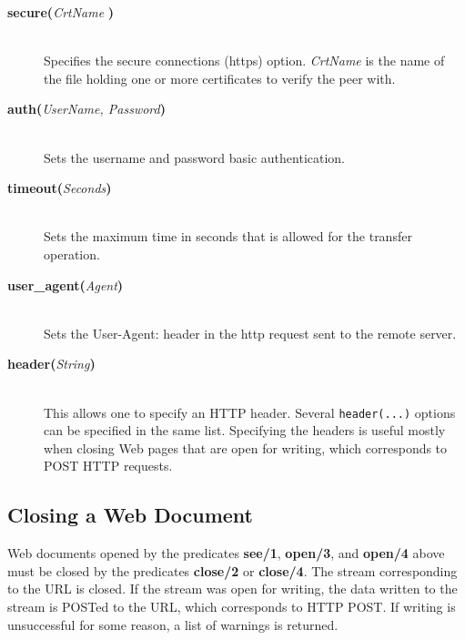 \begin{description}
\begin{description}
  \item[{\bf secure}{\bf (}{\it CrtName}{\bf
    )}]\mbox{}
    \\
    Specifies the secure connections (https) option. \emph{CrtName} is the name of the file holding one or more certificates to verify the peer with. 

  \item[{\bf auth}{\bf (}{\it UserName, \it Password}{\bf )}]\mbox{}\\Sets the username and password basic authentication.

  \item[{\bf timeout}{\bf (}{\it Seconds}{\bf )}]\mbox{}\\Sets the maximum time in seconds that is allowed for the transfer operation.

  \item[{\bf user\_agent}{\bf (}{\it Agent}{\bf )}]\mbox{}\\Sets the User-Agent: header in the http request sent to the remote server.

  \item[{\bf header}{\bf (}{\it String}{\bf )}]\mbox{}\\This allows one
    to specify an HTTP header. Several \texttt{header(...)} options can be
    specified in the same list. Specifying the headers is useful mostly
    when closing
    Web pages that are open for writing, which corresponds to POST HTTP
    requests.

  \end{description}


\end{description}

\subsection{Closing a Web Document}

Web documents opened by the predicates {\bf see/1}, {\bf open/3}, and {\bf
  open/4} above must be closed by the predicates {\bf close/2} or {\bf
  close/4}. The stream corresponding to the URL is closed. If the stream
was open for writing, the data written to the stream is POSTed
to the URL, which corresponds to HTTP POST.
If writing is unsuccessful for some reason,
a list of warnings is returned.


